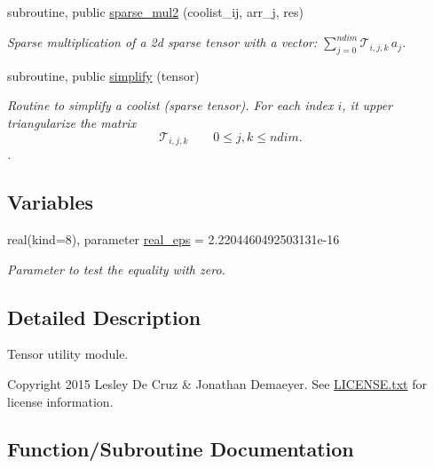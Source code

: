 \begin{DoxyCompactItemize}
subroutine, public \hyperlink{namespacetensor_a70230d57c615d9548905bc023f5fc01d}{sparse\+\_\+mul2} (coolist\+\_\+ij, arr\+\_\+j, res)
\begin{DoxyCompactList}\small\item\em Sparse multiplication of a 2d sparse tensor with a vector\+: ${\displaystyle \sum_{j=0}^{ndim}} \mathcal{T}_{i,j,k} \, a_j $. \end{DoxyCompactList}\item 
subroutine, public \hyperlink{namespacetensor_a364522b80ab0f4785c331eb74fa1ba04}{simplify} (tensor)
\begin{DoxyCompactList}\small\item\em Routine to simplify a coolist (sparse tensor). For each index $i$, it upper triangularize the matrix \[\mathcal{T}_{i,j,k} \qquad 0 \leq j,k \leq ndim.\]. \end{DoxyCompactList}\end{DoxyCompactItemize}
\subsection*{Variables}
\begin{DoxyCompactItemize}
\item 
real(kind=8), parameter \hyperlink{namespacetensor_a2a2ab182d86107e62533c3f0043652cc}{real\+\_\+eps} = 2.\+2204460492503131e-\/16
\begin{DoxyCompactList}\small\item\em Parameter to test the equality with zero. \end{DoxyCompactList}\end{DoxyCompactItemize}


\subsection{Detailed Description}
Tensor utility module. 

\begin{DoxyCopyright}{Copyright}
2015 Lesley De Cruz \& Jonathan Demaeyer. See \hyperlink{LICENSE_8txt}{L\+I\+C\+E\+N\+S\+E.\+txt} for license information. 
\end{DoxyCopyright}


\subsection{Function/\+Subroutine Documentation}
